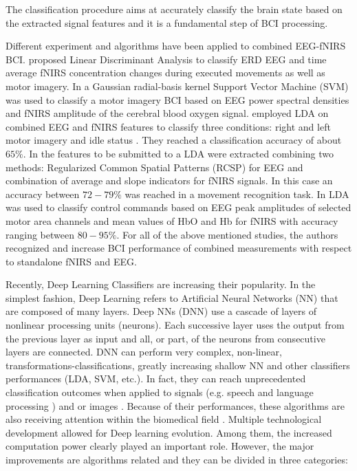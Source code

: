 \documentclass[12pt ]{iopart}
\begin{document}
The classification procedure aims at accurately classify the brain state  based on the extracted signal features  and it is a fundamental step of BCI processing.


Different  experiment and algorithms have been applied  to combined EEG-fNIRS BCI.  \textcite{Fazli_2012} proposed Linear Discriminant Analysis to classify ERD EEG and time average fNIRS concentration changes during executed movements as well as motor imagery.  In \textcite{ma2012hybrid} a Gaussian radial-basis kernel Support Vector Machine (SVM) was used to classify a motor imagery BCI based on EEG power spectral densities and fNIRS amplitude of the cerebral blood oxygen signal.   \textcite{lee2014hybrid} employed LDA on combined EEG and fNIRS features to classify three conditions: right and left motor imagery and idle status . They reached a classification accuracy of about $65\%$. In \textcite{buccino2016hybrid} the features to be submitted to a LDA were extracted combining two methods: Regularized Common Spatial Patterns (RCSP) for EEG and combination of average and slope indicators for fNIRS signals. In this case an accuracy between $72-79\%$ was reached in a movement recognition task. In  \textcite{khan2014decoding, khan2017hybrid} LDA was used to classify control commands based on EEG peak amplitudes of selected motor area channels and mean values of HbO and Hb for fNIRS with accuracy ranging between $80-95\%$.
For all of the above mentioned studies, the authors recognized and increase BCI performance of combined measurements with respect to standalone fNIRS and EEG.

Recently, Deep Learning Classifiers are increasing their popularity. In the simplest fashion, Deep Learning  refers to Artificial Neural Networks (NN) \parencite{lecun2015deep, schmidhuber2015deep} that are composed of many layers. Deep NNs (DNN) use a cascade of  layers of nonlinear processing units (neurons). Each successive layer uses the output from the previous layer as input and all, or part, of the neurons from consecutive layers are connected. DNN can perform very complex, non-linear, transformations-classifications, greatly increasing shallow NN  \parencite{bianchini2014complexity}  and other classifiers performances (LDA, SVM, etc.). In fact, they can reach unprecedented classification outcomes when applied to signals (e.g. speech and language processing ) and or images \parencite{simonyan2014very, hinton2012deep, collobert2008unified, krizhevsky2012imagenet}. Because of their performances, these algorithms are also receiving  attention within the biomedical field \parencite{ronneberger2015u, hudson2000neural, ciresan2012deep}. 
Multiple technological development allowed for Deep learning evolution. 
Among them, the increased computation power clearly played an important role.
However, the major improvements are algorithms related and they can be divided in three  categories:
\end{document}
